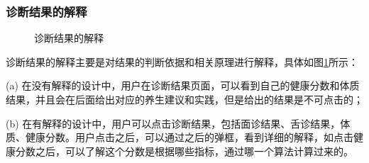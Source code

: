 \subsubsection{诊断结果的解释}
\begin{figure}[htbp]
    \centering
    \caption{诊断结果的解释}
    \label{fig:exp_result}
\end{figure}

诊断结果的解释主要是对结果的判断依据和相关原理进行解释，具体如图\ref{fig:exp_result}所示：

(a) 在没有解释的设计中，用户在诊断结果页面，可以看到自己的健康分数和体质结果，并且会在后面给出对应的养生建议和实践，但是给出的结果是不可点击的；

(b) 在有解释的设计中，用户可以点击诊断结果，包括面诊结果、舌诊结果，体质、健康分数。用户点击之后，可以通过之后的弹框，看到详细的解释，如点击健康分数之后，可以了解这个分数是根据哪些指标，通过哪一个算法计算过来的。

